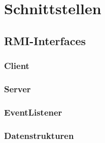 \section{Schnittstellen} 

\subsection{RMI-Interfaces}

\subsubsection{Client}





\subsubsection{Server}



\subsubsection{EventListener}






\subsubsection{Datenstrukturen}








